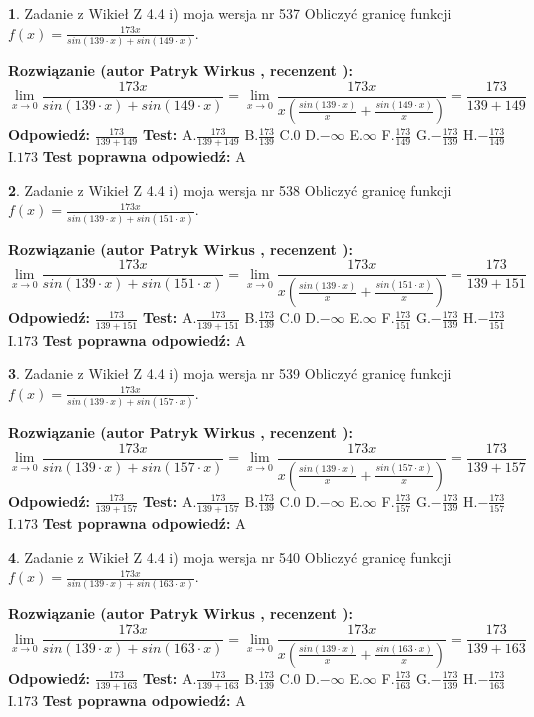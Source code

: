 \documentclass[12pt, a4paper]{article}
\theoremstyle{definition} %
\newtheorem{zad}{}
\newcommand{\zadStart}[1]{\begin{zad}#1\newline}
\newcommand{\zadStop}{\end{zad}}
\newcommand{\rozwStart}[2]{\noindent \textbf{Rozwiązanie (autor #1 , recenzent #2): }\newline}
\newcommand{\rozwStop}{\newline}
\newcommand{\odpStart}{\noindent \textbf{Odpowiedź:}\newline}
\newcommand{\odpStop}{\newline}
\newcommand{\testStart}{\noindent \textbf{Test:}\newline}
\newcommand{\testStop}{\newline}
\newcommand{\kluczStart}{\noindent \textbf{Test poprawna odpowiedź:}\newline}
\newcommand{\kluczStop}{\newline}
\begin{document}
\zadStart{Zadanie z Wikieł Z 4.4 i) moja wersja nr 537}
Obliczyć granicę funkcji $f(x)=\frac{173x}{sin(139\cdot x) +sin(149\cdot x)}$.
\zadStop
\rozwStart{Patryk Wirkus}{}
$$\lim\limits_{x\to 0}\frac{173x}{sin(139\cdot x) +sin(149\cdot x)}=\lim\limits_{x\to 0}\frac{173x}{x(\frac{sin(139\cdot x)}{x}+\frac{sin(149\cdot x)}{x})}=\frac{173}{139+149}$$
\rozwStop
\odpStart
$\frac{173}{139+149}$
\odpStop
\testStart
A.$\frac{173}{139+149}$
B.$\frac{173}{139}$
C.$0$
D.$-\infty$
E.$\infty$
F.$\frac{173}{149}$
G.$-\frac{173}{139}$
H.$-\frac{173}{149}$
I.$173$
\testStop
\kluczStart
A
\kluczStop



\zadStart{Zadanie z Wikieł Z 4.4 i) moja wersja nr 538}
Obliczyć granicę funkcji $f(x)=\frac{173x}{sin(139\cdot x) +sin(151\cdot x)}$.
\zadStop
\rozwStart{Patryk Wirkus}{}
$$\lim\limits_{x\to 0}\frac{173x}{sin(139\cdot x) +sin(151\cdot x)}=\lim\limits_{x\to 0}\frac{173x}{x(\frac{sin(139\cdot x)}{x}+\frac{sin(151\cdot x)}{x})}=\frac{173}{139+151}$$
\rozwStop
\odpStart
$\frac{173}{139+151}$
\odpStop
\testStart
A.$\frac{173}{139+151}$
B.$\frac{173}{139}$
C.$0$
D.$-\infty$
E.$\infty$
F.$\frac{173}{151}$
G.$-\frac{173}{139}$
H.$-\frac{173}{151}$
I.$173$
\testStop
\kluczStart
A
\kluczStop



\zadStart{Zadanie z Wikieł Z 4.4 i) moja wersja nr 539}
Obliczyć granicę funkcji $f(x)=\frac{173x}{sin(139\cdot x) +sin(157\cdot x)}$.
\zadStop
\rozwStart{Patryk Wirkus}{}
$$\lim\limits_{x\to 0}\frac{173x}{sin(139\cdot x) +sin(157\cdot x)}=\lim\limits_{x\to 0}\frac{173x}{x(\frac{sin(139\cdot x)}{x}+\frac{sin(157\cdot x)}{x})}=\frac{173}{139+157}$$
\rozwStop
\odpStart
$\frac{173}{139+157}$
\odpStop
\testStart
A.$\frac{173}{139+157}$
B.$\frac{173}{139}$
C.$0$
D.$-\infty$
E.$\infty$
F.$\frac{173}{157}$
G.$-\frac{173}{139}$
H.$-\frac{173}{157}$
I.$173$
\testStop
\kluczStart
A
\kluczStop



\zadStart{Zadanie z Wikieł Z 4.4 i) moja wersja nr 540}
Obliczyć granicę funkcji $f(x)=\frac{173x}{sin(139\cdot x) +sin(163\cdot x)}$.
\zadStop
\rozwStart{Patryk Wirkus}{}
$$\lim\limits_{x\to 0}\frac{173x}{sin(139\cdot x) +sin(163\cdot x)}=\lim\limits_{x\to 0}\frac{173x}{x(\frac{sin(139\cdot x)}{x}+\frac{sin(163\cdot x)}{x})}=\frac{173}{139+163}$$
\rozwStop
\odpStart
$\frac{173}{139+163}$
\odpStop
\testStart
A.$\frac{173}{139+163}$
B.$\frac{173}{139}$
C.$0$
D.$-\infty$
E.$\infty$
F.$\frac{173}{163}$
G.$-\frac{173}{139}$
H.$-\frac{173}{163}$
I.$173$
\testStop
\kluczStart
A
\kluczStop
\end{document}
